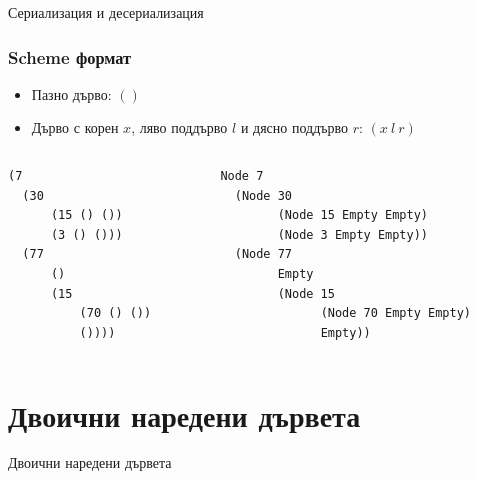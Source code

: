 \documentclass{beamer}
\begin{document}
\begin{frame}
  \centerline{Сериализация и десериализация}
\end{frame}

\begin{frame}[fragile]
  \frametitle{Scheme формат}


\begin{itemize}
  \item Пазно дърво: $()$
  \item Дърво с корен $x$, ляво поддърво $l$ и дясно поддърво $r$: $(x\: l \: r)$
\end{itemize}

\bigskip

\begin{columns}[t]
  \begin{column}{0.35\textwidth}

\begin{verbatim}
(7 
  (30 
      (15 () ()) 
      (3 () ())) 
  (77 
      () 
      (15 
          (70 () ()) 
          ())))  
\end{verbatim}
    
  \end{column}
  \begin{column}{0.65\textwidth}
\begin{verbatim}
Node 7
  (Node 30 
        (Node 15 Empty Empty)
        (Node 3 Empty Empty))
  (Node 77
        Empty
        (Node 15
              (Node 70 Empty Empty)
              Empty))
\end{verbatim}
  \end{column}
\end{columns}




\end{frame}

\section{Двоични наредени дървета}
\begin{frame}
  \centerline{Двоични наредени дървета}
\end{frame}
\end{document}
